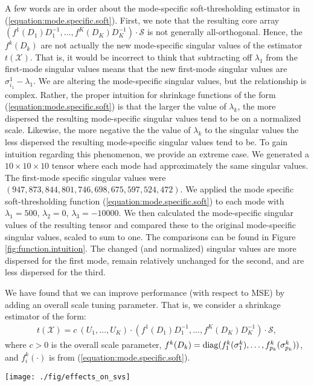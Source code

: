 A few words are in order about the mode-specific soft-thresholding
estimator in (\ref{equation:mode.specific.soft}). First, we note that
the resulting core array $(f^1(D_1)D_1^{-1},\ldots,f^K(D_K)D_K^{-1})
\cdot \mathcal{S}$ is not generally all-orthogonal. Hence, the
$f^k(D_k)$ are not actually the new mode-specific singular values of
the estimator $t(\mathcal{X})$. That is, it would be incorrect to
think that subtracting off $\lambda_1$ from the first-mode singular
values means that the new first-mode singular values are
$\sigma_{i_1}^1 - \lambda_1$. We are altering the mode-specific
singular values, but the relationship is complex. Rather, the proper
intuition for shrinkage functions of the form
(\ref{equation:mode.specific.soft}) is that the larger the value of
$\lambda_k$, the more dispersed the resulting mode-specific singular
values tend to be on a normalized scale. Likewise, the more negative
the the value of $\lambda_k$ to the singular values the less dispersed
the resulting mode-specific singular values tend to be. To gain
intuition regarding this phenomenon, we provide an extreme case. We
generated a $10 \times 10 \times 10$ tensor where each mode had
approximately the same singular values. The first-mode specific
singular values were $(947, 873, 844, 801, 746, 698, 675, 597, 524,
472)$. We applied the mode specific soft-thresholding function
(\ref{equation:mode.specific.soft}) to each mode with $\lambda_1 =
500$, $\lambda_2 = 0$, $\lambda_3 = -10000$. We then calculated the
mode-specific singular values of the resulting tensor and compared
these to the original mode-specific singular values, scaled to sum to
one. The comparisons can be found in Figure
\ref{fig:function.intuition}. The changed (and normalized) singular
values are more dispersed for the first mode, remain relatively
unchanged for the second, and are less dispersed for the third.



We have found that we can improve performance (with respect to MSE) by
adding an overall scale tuning parameter. That is, we consider a
shrinkage estimator of the form:
\begin{align}
  \label{equation:msst.est}
  t(\mathcal{X}) = c\ (U_1,\ldots,U_K)\cdot(f^1(D_1)D_1^{-1},\ldots,f^K(D_K)D_K^{-1})\cdot\mathcal{S},
\end{align}
where $c > 0$ is the overall scale parameter, $f^k(D_k) =
\operatorname*{diag}(f_1^k(\sigma_1^k),\ldots,f_{p_k}^k(\sigma_{p_k}^k))$, and
$f_i^k(\cdot)$ is from (\ref{equation:mode.specific.soft}).

\begin{figure*}
\begin{center}
\texttt{[image: ./fig/effects\_on\_svs]}
\caption{Singular values for the three modes, before and after
  shrinkage, normalized to sum to one.}
\label{fig:function.intuition}
\end{center}
\end{figure*}
